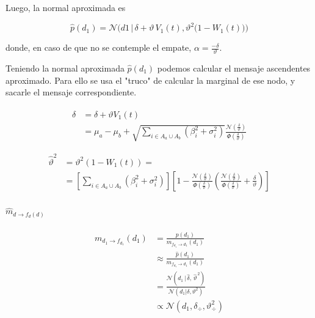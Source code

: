 \documentclass[11pt,twoside,spanish]{report} %
\begin{document}
Luego, la normal aproximada es

\begin{equation}\label{eq:p*_d}
	\widehat{p}(d_1) = \mathcal{N}\Bigg(d1 \,  \bigg| \,  \delta + \vartheta \, V_1(t) ,  \vartheta^2 \big( 1 - W_1(t) \big)  \Bigg)
\end{equation}

donde, en caso de que no se contemple el empate, $\alpha=\frac{-\delta}{\vartheta}$.

Teniendo la normal aproximada $\widehat{p}(d_1)$ podemos calcular el mensaje ascendentes aproximado. Para ello se usa el "truco" de calcular la marginal de ese nodo, y sacarle el mensaje correspondiente.

\begin{equation}
	\begin{split}
		\widehat{\delta} &= \delta+\vartheta V_1(t) \\
		& = \mu_{a}-\mu_{b}+\sqrt{\sum_{i\in A_{a}\cup A_{b}}(\beta_i^2+\sigma_i^2)}\frac{\mathcal{N}(\frac{\delta}{\vartheta})}{\Phi(\frac{\delta}{\vartheta})}
	\end{split}
\end{equation}

\begin{equation}
	\begin{split}
		\widehat{\vartheta}^2 &= \vartheta^2(1-W_1(t)) = \\
		&=\left[\sum_{i\in A_{a}\cup A_{b}}(\beta_i^2+\sigma_i^2)\right]\left[1-\frac{\mathcal{N}(\frac{\delta}{\vartheta})}{\Phi(\frac{\delta}{\vartheta})}\left(\frac{\mathcal{N}(\frac{\delta}{\vartheta})}{\Phi(\frac{\delta}{\vartheta})}+ \frac{\delta}{\vartheta}\right)\right]
	\end{split}
\end{equation}

\paragraph{$\widehat{m}_{d \rightarrow f_{d}(d)}$}

\begin{equation}\label{eq:m^_d_fd}
	\begin{split}
		m_{d_1 \rightarrow f_{d_1}}(d_1) &= \frac{p(d_1)}{m_{f_{d_1} \rightarrow d_1}(d_1)} \\
		&\approx \frac{\widehat{p}(d_1)}{m_{f_{d_1} \rightarrow d_1}(d_1)} \\
		& =  \frac{\mathcal{N}(d_1 \,  | \,\widehat{\delta} , \, \widehat{\vartheta}^{\,2} )}{\mathcal{N}(d_1 | \delta, \vartheta^2)} \\
		&\propto \mathcal{N}(d_1,\delta_{\div},\vartheta_{\div}^2 )
	\end{split}
\end{equation}
\end{document}
